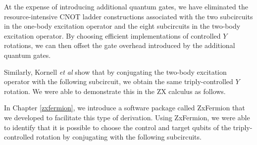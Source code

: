 At the expense of introducing additional quantum gates, we have eliminated the resource-intensive CNOT ladder constructions associated with the two subcircuits in the one-body excitation operator and the eight subcircuits in the two-body excitation operator. By choosing efficient implementations of controlled $Y$ rotations, we can then offset the gate overhead introduced by the additional quantum gates.

Similarly, Kornell \textit{et al} \cite{Kornell2023} show that by conjugating the two-body excitation operator with the following subcircuit, we obtain the same triply-controlled $Y$ rotation. We were able to demonstrate this in the ZX calculus as follows.


In Chapter \ref{zxfermion}, we introduce a software package called ZxFermion that we developed to facilitate this type of derivation. Using ZxFermion, we were able to identify that it is possible to choose the control and target qubits of the triply-controlled rotation by conjugating with the following subcircuits.



